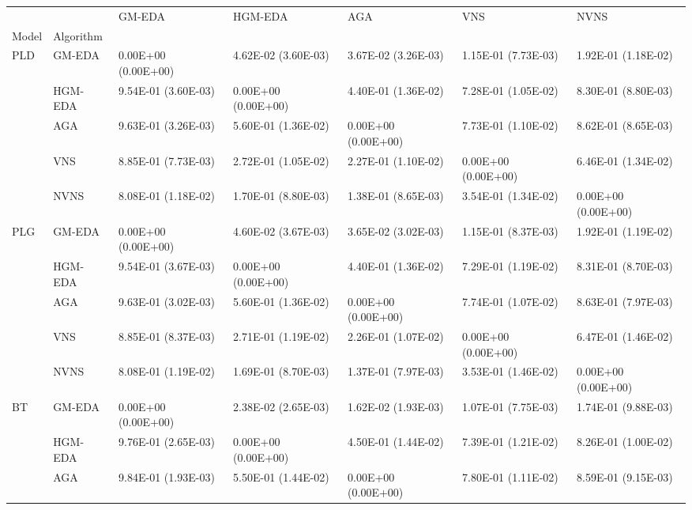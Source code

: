 \begin{tabular}{lllllll}
\toprule
   &      &               GM-EDA &              HGM-EDA &                  AGA &                  VNS &                 NVNS \\
Model & Algorithm &                      &                      &                      &                      &                      \\
\midrule
PLD & GM-EDA &  0.00E+00 (0.00E+00) &  4.62E-02 (3.60E-03) &  3.67E-02 (3.26E-03) &  1.15E-01 (7.73E-03) &  1.92E-01 (1.18E-02) \\
   & HGM-EDA &  9.54E-01 (3.60E-03) &  0.00E+00 (0.00E+00) &  4.40E-01 (1.36E-02) &  7.28E-01 (1.05E-02) &  8.30E-01 (8.80E-03) \\
   & AGA &  9.63E-01 (3.26E-03) &  5.60E-01 (1.36E-02) &  0.00E+00 (0.00E+00) &  7.73E-01 (1.10E-02) &  8.62E-01 (8.65E-03) \\
   & VNS &  8.85E-01 (7.73E-03) &  2.72E-01 (1.05E-02) &  2.27E-01 (1.10E-02) &  0.00E+00 (0.00E+00) &  6.46E-01 (1.34E-02) \\
   & NVNS &  8.08E-01 (1.18E-02) &  1.70E-01 (8.80E-03) &  1.38E-01 (8.65E-03) &  3.54E-01 (1.34E-02) &  0.00E+00 (0.00E+00) \\
PLG & GM-EDA &  0.00E+00 (0.00E+00) &  4.60E-02 (3.67E-03) &  3.65E-02 (3.02E-03) &  1.15E-01 (8.37E-03) &  1.92E-01 (1.19E-02) \\
   & HGM-EDA &  9.54E-01 (3.67E-03) &  0.00E+00 (0.00E+00) &  4.40E-01 (1.36E-02) &  7.29E-01 (1.19E-02) &  8.31E-01 (8.70E-03) \\
   & AGA &  9.63E-01 (3.02E-03) &  5.60E-01 (1.36E-02) &  0.00E+00 (0.00E+00) &  7.74E-01 (1.07E-02) &  8.63E-01 (7.97E-03) \\
   & VNS &  8.85E-01 (8.37E-03) &  2.71E-01 (1.19E-02) &  2.26E-01 (1.07E-02) &  0.00E+00 (0.00E+00) &  6.47E-01 (1.46E-02) \\
   & NVNS &  8.08E-01 (1.19E-02) &  1.69E-01 (8.70E-03) &  1.37E-01 (7.97E-03) &  3.53E-01 (1.46E-02) &  0.00E+00 (0.00E+00) \\
BT & GM-EDA &  0.00E+00 (0.00E+00) &  2.38E-02 (2.65E-03) &  1.62E-02 (1.93E-03) &  1.07E-01 (7.75E-03) &  1.74E-01 (9.88E-03) \\
   & HGM-EDA &  9.76E-01 (2.65E-03) &  0.00E+00 (0.00E+00) &  4.50E-01 (1.44E-02) &  7.39E-01 (1.21E-02) &  8.26E-01 (1.00E-02) \\
   & AGA &  9.84E-01 (1.93E-03) &  5.50E-01 (1.44E-02) &  0.00E+00 (0.00E+00) &  7.80E-01 (1.11E-02) &  8.59E-01 (9.15E-03) \\

\end{tabular}
